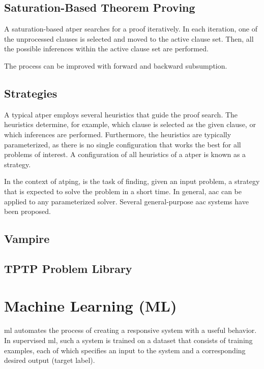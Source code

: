 \subsection{Saturation-Based Theorem Proving}

A saturation-based \gls{atper} searches for a proof iteratively.
In each iteration, one of the unprocessed clauses is selected and moved to the active clause set.
Then, all the possible inferences within the active clause set are performed.

The process can be improved with forward and backward subsumption.

\subsection{Strategies}

A typical \gls{atper} employs several heuristics that guide the proof search.
The heuristics determine, for example, which clause is selected as the given clause, or which inferences are performed.
Furthermore, the heuristics are typically parameterized, as there is no single configuration that works the best for all problems of interest.
A configuration of all heuristics of a \gls{atper} is known as a strategy.

In the context of \gls{atping},  is the task of finding, given an input problem, a strategy that is expected to solve the problem in a short time.
In general, \gls{aac} can be applied to any parameterized solver.
Several general-purpose \gls{aac} systems have been proposed.

\subsection{Vampire}

\subsection{TPTP Problem Library}

\section{Machine Learning (ML)}

\Gls{ml} automates the process of creating a responsive system with a useful behavior.
In supervised \gls{ml}, such a system is trained on a dataset that consists of training examples,
each of which specifies an input to the system and a corresponding desired output (target label).

